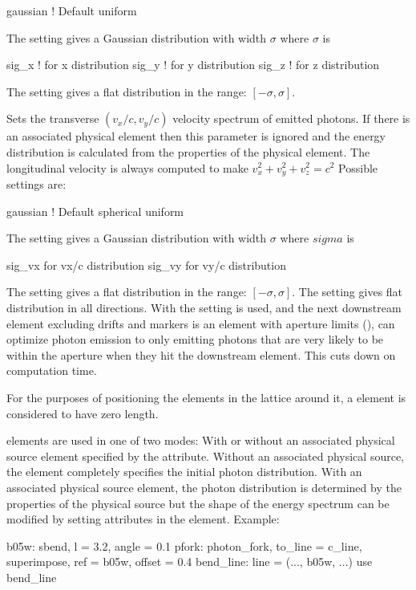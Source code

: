 {\begin{description}
\begin{example}
  gaussian    ! Default
  uniform
\end{example}
The  setting gives a Gaussian distribution with width
$\sigma$ where $\sigma$ is 
\begin{example}
  sig_x     ! for x distribution
  sig_y     ! for y distribution
  sig_z     ! for z distribution
\end{example}
The  setting gives a flat
distribution in the range: $[-\sigma, \sigma]$.
%
  \item[\vn{velocity_distribution}] \Newline
Sets the transverse $(v_x/c, v_y/c)$ velocity spectrum of emitted photons. If there is an associated
physical element then this parameter is ignored and the energy distribution is calculated from the
properties of the physical element. The longitudinal velocity is always computed to make $v_x^2 +
v_y^2 + v_z^2 = c^2$ Possible settings are:
\begin{example}
  gaussian    ! Default
  spherical
  uniform
\end{example}
The  setting gives a Gaussian distribution with width
$\sigma$ where $sigma$ is 
\begin{example}
  sig_vx     for vx/c distribution
  sig_vy     for vy/c distribution
\end{example}
The  setting gives a flat distribution in the range: $[-\sigma, \sigma]$. The
 setting gives flat distribution in all directions. With the 
setting is used, and the next downstream element excluding drifts and markers is an element
with aperture limits (), \bmad can optimize photon emission to only emitting 
photons that are very likely to be within the aperture when they hit the downstream element.
This cuts down on computation time.
%
\end{description}

For the purposes of positioning the elements in the lattice around it,
a  element is considered to have zero length.

 elements are used in one of two modes: With or without an associated physical
source element specified by the  attribute. Without an associated physical
source, the  element completely specifies the initial photon distribution. With an
associated physical source element, the photon distribution is determined by the properties of the
physical source but the shape of the energy spectrum can be modified by setting attributes in the
 element. Example:
\begin{example}
  b05w: sbend, l = 3.2, angle = 0.1
  pfork: photon_fork, to_line = c_line, superimpose, ref = b05w, offset = 0.4
  bend_line: line = (..., b05w, ...)
  use bend_line


\end{example}}
